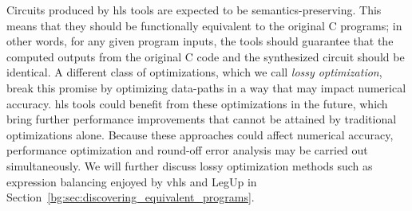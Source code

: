 Circuits produced by \gls{hls} tools are expected to be semantics-preserving.
This means that they should be functionally equivalent to the original
C programs; in other words, for any given program inputs, the tools
should guarantee that the computed outputs from the original C code
and the synthesized circuit should be identical.  A different class of
optimizations, which we call \emph{lossy optimization}, break this promise by
optimizing data-paths in a way that may impact numerical accuracy.  \Gls{hls}
tools could benefit from these optimizations in the future, which bring
further performance improvements that cannot be attained by traditional
optimizations alone.  Because these approaches could affect numerical
accuracy, performance optimization and round-off error analysis may be
carried out simultaneously.  We will further discuss lossy optimization
methods such as expression balancing enjoyed by \gls{vhls} and LegUp in
Section~\ref{bg:sec:discovering_equivalent_programs}.
